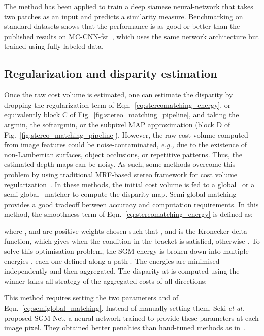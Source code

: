\documentclass[10pt,journal,compsoc]{IEEEtran}
\newcommand{\eg}{\emph{e.g., }}
\newcommand{\etal}{\emph{et al.}}
\newcommand{\noi}{\noindent}
\begin{document}
\noi The method has been applied to train a deep siamese neural-network that takes two patches as an input and predicts a similarity measure.
Benchmarking on standard datasets shows that the performance is as good or better than the published results on MC-CNN-fst~\cite{zbontar2015computing}, which uses the same network architecture but trained using fully labeled data.


	
	
\subsection{Regularization and disparity estimation}

Once the raw  cost volume is estimated, one can estimate the disparity  by  dropping the regularization term of Eqn.~\eqref{eq:stereomatching_energy}, or equivalently block C of Fig.~\ref{fig:stereo_matching_pipeline},  and taking the argmin, the softargmin, or the subpixel MAP approximation (block D of Fig.~\ref{fig:stereo_matching_pipeline}).   However, the raw cost volume computed from image features could be noise-contaminated, \eg due to the existence of non-Lambertian surfaces, object occlusions, or repetitive patterns. Thus, the estimated depth maps can be noisy.   As such, some methods overcome this problem by using traditional MRF-based stereo framework for cost volume regularization~\cite{chen2015deep,zbontar2015computing,luo2016efficient}. In these methods, the initial cost volume   is fed to a  global~\cite{scharstein2002taxonomy} or a semi-global~\cite{hirschmuller2008stereo} matcher to compute the disparity map.  Semi-global matching  provides a good tradeoff between accuracy and computation requirements. In this method, the smoothness term of Eqn.~\eqref{eq:stereomatching_energy} is defined as:


\noi where ,   and  are positive weights chosen such that , and  is the Kronecker delta function, which gives  when the condition in the bracket is satisfied, otherwise .  To solve this optimisation problem, the SGM energy is broken down into multiple energies , each one defined along a path . The energies are  minimised independently and then aggregated. The disparity at  is computed using the winner-takes-all strategy of the aggregated costs of all directions:


\noi This method requires setting the two parameters  and  of Eqn.~\eqref{eq:semiglobal_matching}. Instead of manually setting them,  Seki \etal~\cite{seki2017sgm} proposed  SGM-Net, a neural network trained to provide these parameters at each image pixel.  They obtained better penalties than  hand-tuned methods as in~\cite{zbontar2015computing}. 
\end{document}
